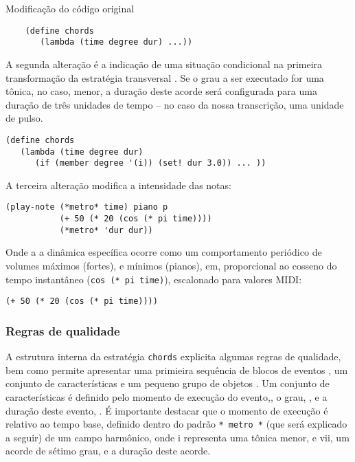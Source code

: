 \begin{example}{Modificação do código original}
\begin{verbatim}
    (define chords
       (lambda (time degree dur) ...))
\end{verbatim}


A segunda alteração é a indicação de uma situação condicional na primeira transformação da estratégia transversal . Se o grau a ser executado for uma tônica, no caso, menor, a duração deste acorde será configurada para uma duração de três unidades de tempo -- no caso da nossa transcrição, uma unidade de pulso.

\begin{verbatim}
(define chords
   (lambda (time degree dur)
      (if (member degree '(i)) (set! dur 3.0)) ... ))
\end{verbatim}

A terceira alteração modifica a intensidade das notas:

\begin{verbatim}
(play-note (*metro* time) piano p
           (+ 50 (* 20 (cos (* pi time))))
           (*metro* 'dur dur))
\end{verbatim}

Onde a a dinâmica específica ocorre como um comportamento periódico de volumes máximos (fortes), e mínimos (pianos), em, proporcional ao cosseno do tempo instantâneo (\verb|cos (* pi time)|), escalonado para valores MIDI:

\begin{verbatim}
(+ 50 (* 20 (cos (* pi time))))
\end{verbatim}
\end{example}

\subsubsection{Regras de qualidade}\label{sec:regras_qualidade}

A estrutura interna da estratégia \verb|chords| explicita algumas regras de qualidade, bem como permite apresentar uma primieira sequência de blocos de eventos , um conjunto de características  e um pequeno grupo de objetos . Um conjunto de características é definido pelo momento de execução do evento,, o grau, , e a duração deste evento, . É importante destacar que o momento de execução é relativo ao tempo base, definido dentro do padrão \verb|* metro *| (que será explicado a seguir) de um campo harmônico, onde i representa uma tônica menor, e vii, um acorde de sétimo grau, e a duração deste acorde.


